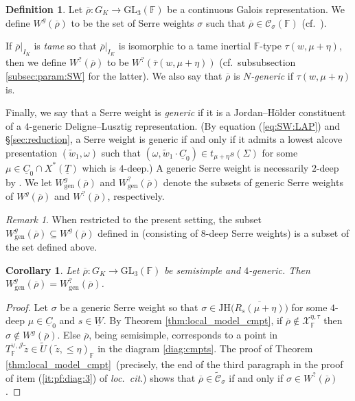 \documentclass[oneside,a4paper,english, 11pt]{amsart}
\theoremstyle{plain}
\theoremstyle{plain}
\theoremstyle{plain}
\theoremstyle{plain}
\theoremstyle{plain}
\theoremstyle{plain}
\newtheorem{cor}[thm]{Corollary}
\theoremstyle{definition}
\newtheorem{defn}[thm]{Definition}
\theoremstyle{definition}
\theoremstyle{definition}
\theoremstyle{remark}
\newtheorem{rmk}[thm]{Remark}
\numberwithin{equation}{section}
\newcommand{\F}{\mathbb{F}}
\newcommand{\cC}{\mathcal{C}}
\newcommand{\cJ}{\mathcal{J}}
\newcommand{\cX}{\mathcal{X}}
\newcommand{\GL}{\mathrm{GL}}
\newcommand{\un}[1]{\underline{#1}}
\newcommand{\tld}[1]{\widetilde{#1}}
\newcommand{\JH}{\mathrm{JH}}
\newcommand{\rhobar}{\overline{\rho}}
\newcommand{\taubar}{\overline{\tau}}
\newcommand{\ovl}[1]{\overline{#1}}
\newcommand{\ra}{\rightarrow}
\begin{document}
\begin{defn}
\label{def:gen:W}
Let $\rhobar:G_K\ra\GL_3(\F)$ be a continuous Galois representation.
We define $W^g(\rhobar)$ to be the set of Serre weights $\sigma$ such that $\rhobar\in \cC_\sigma(\F)$ (cf.~\cite[Definition 9.1.2]{MLM}).

If $\rhobar|_{I_K}$ is \emph{tame} so that $\rhobar|_{I_K}$ is isomorphic to a tame inertial $\F$-type $\tau(w,\mu+\eta)$, then we define $W^?(\rhobar)$ to be $W^?(\taubar(w,\mu+\eta))$ (cf.~subsubsection \ref{subsec:param:SW} for the latter).   We also say that $\rhobar$ is \emph{$N$-generic} if $\tau(w,\mu+\eta)$ is.

Finally, we say that a Serre weight is \emph{generic} if it is a Jordan--H\"older constituent of a $4$-generic Deligne--Lusztig representation. 
(By equation (\ref{eq:SW:LAP}) and \S \ref{sec:reduction}, a Serre weight is generic if and only if it admits a lowest alcove presentation $(\tld{w}_1,\omega)$ such that $(\omega,\tld{w}_1\cdot \un{C}_0)\in t_{\mu+\eta}s(\Sigma)$ for some $\mu\in \un{C}_0\cap X^*(\un{T})$ which is $4$-deep.)
A generic Serre weight is necessarily $2$-deep by \cite[Proposition 2.3.7]{MLM}. 
We let $W^g_{\mathrm{gen}}(\rhobar)$ and $W^?_{\mathrm{gen}}(\rhobar)$ denote the subsets of generic Serre weights of $W^g(\rhobar)$ and $W^?(\rhobar)$, respectively. 
%
\end{defn}
\begin{rmk}
When restricted to the present setting, the subset $W^g_{\mathrm{gen}}(\rhobar)\subseteq W^g(\rhobar)$ defined in \cite[Definition 9.1.2]{MLM} (consisting of $8$-deep Serre weights) is a subset of the set defined above. 
\end{rmk}
%
%
\begin{cor}\label{cor:sspts}
Let $\rhobar: G_K \ra \GL_3(\F)$ be semisimple and $4$-generic.
%
%
%
%
Then $W^g_{\mathrm{gen}}(\rhobar) = W_{\mathrm{gen}}^?(\rhobar)$.
%
%
%
%
\end{cor}
\begin{proof}
Let $\sigma$ be a generic Serre weight so that $\sigma\in \JH\big(\ovl{R_{s}(\mu+\eta)}\big)$ for some $4$-deep $\mu\in\un{C}_0$ and $s\in \un{W}$. 
By Theorem \ref{thm:local_model_cmpt}, if $\rhobar\notin \cX^{\eta,\tau}_{\F}$ then $\sigma\notin W^g(\rhobar)$. 
%
Else $\rhobar$, being semisimple, corresponds to a point in $T_{\F}^{\vee,\cJ}\tld{z}\in\tld{U}(\tld{z},\leq\eta)_{\F}$ in the diagram \eqref{diag:cmpts}.
The proof of Theorem \ref{thm:local_model_cmpt}~(precisely, the end of the third paragraph in the proof of item (\ref{it:pf:diag:3}) of \emph{loc.~cit}.) shows that $\rhobar\in \tld{\cC}_\sigma$ if and only if $\sigma\in W^?(\rhobar)$. 
\end{proof}
\end{document}
